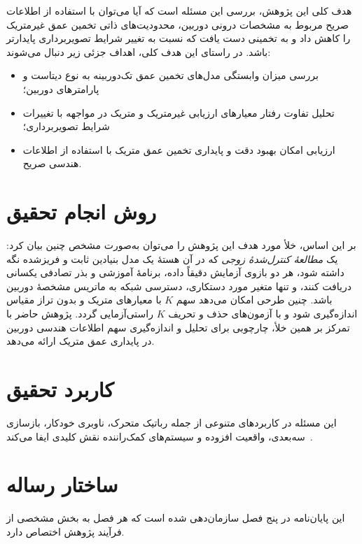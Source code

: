 هدف کلی این پژوهش، بررسی این مسئله است که آیا می‌توان با استفاده از اطلاعات صریح مربوط به مشخصات درونی دوربین، محدودیت‌های ذاتی تخمین عمق غیرمتریک را کاهش داد و به تخمینی دست یافت که نسبت به تغییر شرایط تصویربرداری پایدارتر باشد. در راستای این هدف کلی، اهداف جزئی زیر دنبال می‌شوند:
\begin{itemize}
	\item
	بررسی میزان وابستگی مدل‌های تخمین عمق تک‌دوربینه به نوع دیتاست و پارامترهای دوربین؛
	\item
	تحلیل تفاوت رفتار معیارهای ارزیابی غیرمتریک و متریک در مواجهه با تغییرات شرایط تصویربرداری؛
	\item
	ارزیابی امکان بهبود دقت و پایداری تخمین عمق متریک با استفاده از اطلاعات هندسی صریح.
\end{itemize}

\section{روش انجام تحقیق}
بر این اساس، خلأ مورد هدف این پژوهش را می‌توان به‌صورت مشخص چنین بیان کرد: یک
\emph{مطالعهٔ کنترل‌شدهٔ زوجی} که در آن هستهٔ یک مدل بنیادین ثابت و فریزشده نگه
داشته شود، هر دو بازوی آزمایش دقیقاً داده، برنامهٔ آموزشی و بذر تصادفی یکسانی
دریافت کنند، و تنها متغیر مورد دستکاری، دسترسی شبکه به ماتریس مشخصهٔ دوربین باشد.
چنین طرحی امکان می‌دهد سهم $K$ با معیارهای متریک و بدون تراز مقیاس اندازه‌گیری
شود و با آزمون‌های حذف و تحریف $K$ راستی‌آزمایی گردد. پژوهش حاضر با تمرکز بر همین
خلأ، چارچوبی برای تحلیل و اندازه‌گیری سهم اطلاعات هندسی دوربین در پایداری عمق
متریک ارائه می‌دهد.


\section{کاربرد تحقیق}
این مسئله در کاربردهای متنوعی از جمله رباتیک متحرک، ناوبری خودکار، بازسازی سه‌بعدی، واقعیت افزوده و سیستم‌های کمک‌راننده نقش کلیدی ایفا می‌کند~\cite{Godard2017Unsupervised,Ranftl2019Robust}.

\section{ساختار رساله}
این پایان‌نامه در پنج فصل سازمان‌دهی شده است که هر فصل به بخش مشخصی از فرآیند پژوهش اختصاص دارد.

